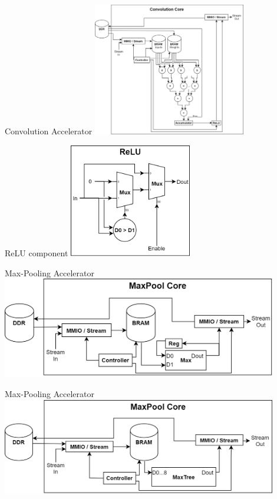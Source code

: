 \begin{frame}{Convolution Accelerator}
	\centering
	\includegraphics[width=0.5\textwidth]{../Images/Platform/Conv_core_row_parallel.png}\\
\end{frame}

\begin{frame}{ReLU component}
	\centering
	\includegraphics[width=0.4\textwidth]{../Images/Platform/ReLU_component.png}\\
\end{frame}

\begin{frame}{Max-Pooling Accelerator}
	\centering
	\includegraphics[width=0.9\textwidth]{../Images/Platform/MaxPool_core_serial.png}\\
\end{frame}

\begin{frame}{Max-Pooling Accelerator}
	\centering
	\includegraphics[width=0.9\textwidth]{../Images/Platform/MaxPool_core_kernel_parallel.png}\\
\end{frame}


